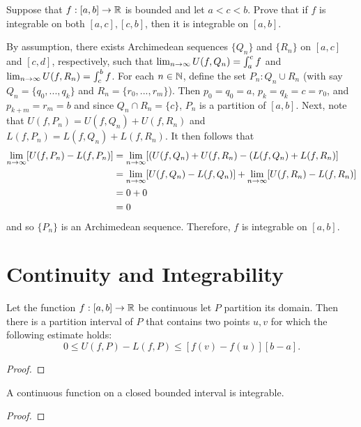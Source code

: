 \documentclass[letterpaper, twoside, 12pt]{book}
\begin{document}
\begin{exercise}[6]
  Suppose that \(f:[a,b]\to\mathbb R\) is bounded and let \(a<c<b\). Prove that if
  \(f\) is integrable on both \([a,c],[c,b]\), then it is integrable on
  \([a,b]\).
\end{exercise}

\begin{solution}
    By assumption, there exists Archimedean sequences \(\{Q_n\}\) and \(\{R_n\}\) on
    \([a, c]\) and \([c, d]\), respectively, such that \(\lim_{n \to \infty} U(f, Q_n) = \int_a^c f\)
    and \(\lim_{n \to \infty} U(f, R_n) = \int_c^b f\). For each \(n \in \mathbb N\), define the
    set \(P_n : Q_n \cup R_n\) (with say \(Q_n = \{q_0, ..., q_k\}\) and 
    \(R_n = \{r_0, ..., r_m\}\)). Then \(p_0 = q_0 = a\), \(p_k = q_k = c = r_0\),
    and \(p_{k+m} = r_m = b\) and since \(Q_n \cap R_n = \{c\}\), \(P_n\) is 
    a partition of \([a,b]\). Next, note that \(U(f, P_n) = U(f, Q_n) + U(f, R_n)\)
    and \(L(f, P_n) = L(f, Q_n) + L(f, R_n)\). It then follows that
    \begin{align*}
        \lim_{n \to \infty} [ U(f, P_n) - L(f, P_n) ] &= \lim_{n \to \infty} [ (U(f, Q_n) + U(f, R_n) - (L(f, Q_n) + L(f, R_n) ] \\
                &= \lim_{n \to \infty} [U(f, Q_n) - L(f, Q_n)] + \lim_{n \to \infty} [U(f, R_n) - L(f, R_n)] \\
                &= 0 + 0 \\
                &= 0 \\
    \end{align*}
    and so \(\{P_n\}\) is an Archimedean sequence. Therefore, \(f\) is integrable on \([a,b]\).
\end{solution}




\section{Continuity and Integrability}


\begin{lemma}[6.17]
  Let the function \(f:[a,b]\to\mathbb R\) be continuous let \(P\) partition
  its domain. Then there is a partition interval of \(P\) that contains two
  points \(u,v\) for which the following estimate holds:
  \[
    0
      \leq
    U(f,P)-L(f,P)
      \leq
    [f(v)-f(u)][b-a]
  .\]
\end{lemma}
\begin{proof}

\end{proof}


\begin{theorem}[6.18]
  A continuous function on a closed bounded interval is integrable.
\end{theorem}
\begin{proof}

\end{proof}
\end{document}
